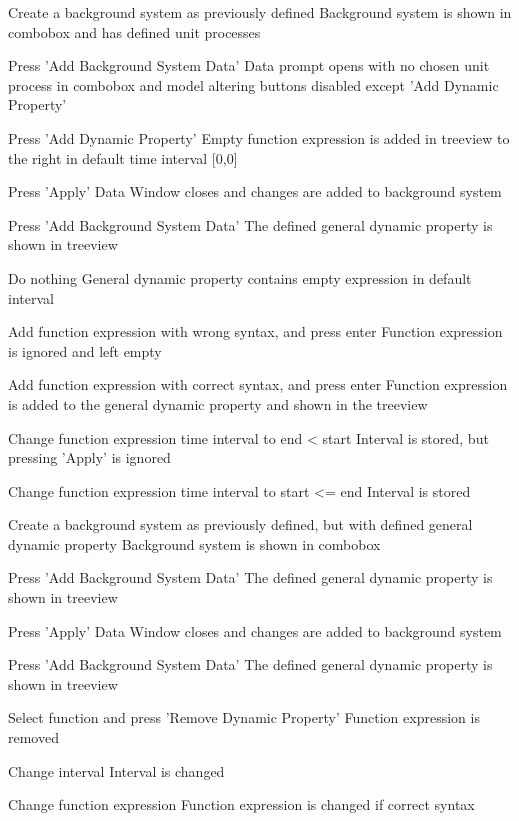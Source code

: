 {
\step
{Create a background system as previously defined}
{Background system is shown in combobox and has defined unit processes}

\step
{Press 'Add Background System Data'}
{Data prompt opens with no chosen unit process in combobox and model altering buttons disabled except 'Add Dynamic Property'}

\step
{Press 'Add Dynamic Property'}
{Empty function expression is added in treeview to the right in default time interval [0,0]}

\placeholder

\step
{Press 'Apply'}
{Data Window closes and changes are added to background system}

\step
{Press 'Add Background System Data'}
{The defined general dynamic property is shown in treeview}
}

\placeholders
{
\step
{Do nothing}
{General dynamic property contains empty expression in default interval}

\step
{Add function expression with wrong syntax, and press enter}
{Function expression is ignored and left empty}

\step
{Add function expression with correct syntax, and press enter}
{Function expression is added to the general dynamic property and shown in the treeview}

\step
{Change function expression time interval to end < start}
{Interval is stored, but pressing 'Apply' is ignored}

\step
{Change function expression time interval to start <= end}
{Interval is stored}
}




{
\step
{Create a background system as previously defined, but with defined general dynamic property}
{Background system is shown in combobox}

\step
{Press 'Add Background System Data'}
{The defined general dynamic property is shown in treeview}

\placeholder

\step
{Press 'Apply'}
{Data Window closes and changes are added to background system}

\step
{Press 'Add Background System Data'}
{The defined general dynamic property is shown in treeview}
}

\placeholders
{
\step
{Select function and press 'Remove Dynamic Property'}
{Function expression is removed}

\step
{Change interval}
{Interval is changed}

\step
{Change function expression}
{Function expression is changed if correct syntax}
}

